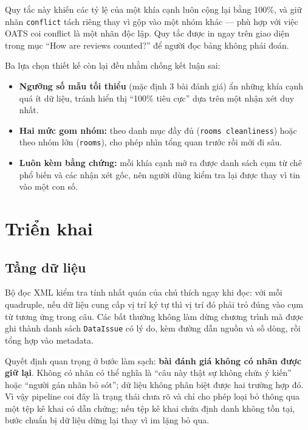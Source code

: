 \documentclass[12pt,a4paper]{report}
\newcommand{\enquote}[1]{“#1”}
\newcommand{\code}[1]{\texttt{#1}}
\begin{document}
Quy tắc này khiến các tỷ lệ của một khía cạnh luôn cộng lại bằng 100\%, và giữ nhãn \code{conflict} tách riêng thay vì
gộp vào một nhóm khác --- phù hợp với việc OATS coi conflict là một nhãn độc lập. Quy tắc được in ngay trên giao diện
trong mục \enquote{How are reviews counted?} để người đọc bảng không phải đoán.

Ba lựa chọn thiết kế còn lại đều nhằm chống kết luận sai:

\begin{itemize}
  \item \textbf{Ngưỡng số mẫu tối thiểu} (mặc định 3 bài đánh giá) ẩn những khía cạnh quá ít dữ liệu, tránh hiển thị
        \enquote{100\% tiêu cực} dựa trên một nhận xét duy nhất.
  \item \textbf{Hai mức gom nhóm:} theo danh mục đầy đủ (\code{rooms cleanliness}) hoặc theo nhóm lớn (\code{rooms}),
        cho phép nhìn tổng quan trước rồi mới đi sâu.
  \item \textbf{Luôn kèm bằng chứng:} mỗi khía cạnh mở ra được danh sách cụm từ chê phổ biến và các nhận xét gốc, nên
        người dùng kiểm tra lại được thay vì tin vào một con số.
\end{itemize}

\chapter{Triển khai}
\label{chap:trienkhai}

\section{Tầng dữ liệu}

Bộ đọc XML kiểm tra tính nhất quán của chú thích ngay khi đọc: với mỗi quadruple, nếu dữ liệu cung cấp vị trí ký tự thì
vị trí đó phải trỏ đúng vào cụm từ tương ứng trong câu. Các bất thường không làm dừng chương trình mà được ghi thành
danh sách \code{DataIssue} có lý do, kèm đường dẫn nguồn và số dòng, rồi tổng hợp vào metadata.

Quyết định quan trọng ở bước làm sạch: \textbf{bài đánh giá không có nhãn được giữ lại}. Không có nhãn có thể nghĩa là
\enquote{câu này thật sự không chứa ý kiến} hoặc \enquote{người gán nhãn bỏ sót}; dữ liệu không phân biệt được hai
trường hợp đó. Vì vậy pipeline coi đây là trạng thái chưa rõ và chỉ cho phép loại bỏ thông qua một tệp kê khai có dẫn
chứng; nếu tệp kê khai chứa định danh không tồn tại, bước chuẩn bị dữ liệu dừng lại thay vì im lặng bỏ qua.
\end{document}
